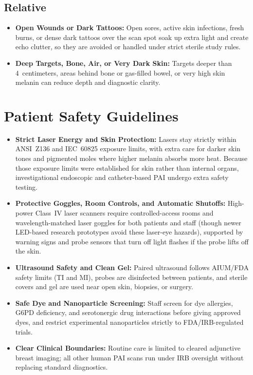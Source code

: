 \subsection{Relative}
\begin{itemize}
  \item \textbf{Open Wounds or Dark Tattoos:} Open sores, active skin infections, fresh burns, or dense dark tattoos over the scan spot soak up extra light and create echo clutter, so they are avoided or handled under strict sterile study rules.
  \item \textbf{Deep Targets, Bone, Air, or Very Dark Skin:} Targets deeper than 4~centimeters, areas behind bone or gas-filled bowel, or very high skin melanin can reduce depth and diagnostic clarity.
\end{itemize}

\section{Patient Safety Guidelines}
\begin{itemize}
  \item \textbf{Strict Laser Energy and Skin Protection:} Lasers stay strictly within ANSI~Z136 and IEC~60825 exposure limits, with extra care for darker skin tones and pigmented moles where higher melanin absorbs more heat. Because those exposure limits were established for skin rather than internal organs, investigational endoscopic and catheter-based PAI undergo extra safety testing.
  \item \textbf{Protective Goggles, Room Controls, and Automatic Shutoffs:} High-power Class~IV laser scanners require controlled-access rooms and wavelength-matched laser goggles for both patients and staff (though newer LED-based research prototypes avoid these laser-eye hazards), supported by warning signs and probe sensors that turn off light flashes if the probe lifts off the skin.
  \item \textbf{Ultrasound Safety and Clean Gel:} Paired ultrasound follows AIUM/FDA safety limits (TI and MI), probes are disinfected between patients, and sterile covers and gel are used near open skin, biopsies, or surgery.
  \item \textbf{Safe Dye and Nanoparticle Screening:} Staff screen for dye allergies, G6PD deficiency, and serotonergic drug interactions before giving approved dyes, and restrict experimental nanoparticles strictly to FDA/IRB-regulated trials.
  \item \textbf{Clear Clinical Boundaries:} Routine care is limited to cleared adjunctive breast imaging; all other human PAI scans run under IRB oversight without replacing standard diagnostics.
\end{itemize}

